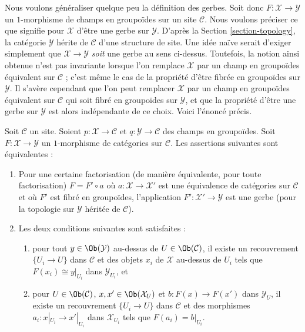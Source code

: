 \noindent
Nous voulons généraliser quelque peu la définition des gerbes. Soit donc
$F : \mathcal{X} \to \mathcal{Y}$ un $1$-morphisme de champs en groupoïdes
sur un site $\mathcal{C}$. Nous voulons préciser ce que signifie
pour $\mathcal{X}$ d'être une gerbe sur $\mathcal{Y}$. D'après la
Section \ref{section-topology},
la catégorie $\mathcal{Y}$ hérite de $\mathcal{C}$ d'une structure de site.
Une idée naïve serait d'exiger simplement que
$\mathcal{X} \to \mathcal{Y}$ {\it soit} une gerbe au sens ci-dessus. Toutefois,
la notion ainsi obtenue n'est pas invariante lorsque l'on remplace $\mathcal{X}$
par un champ en groupoïdes équivalent sur $\mathcal{C}$ ; c'est même le
cas de la propriété d'être fibrée en groupoïdes sur $\mathcal{Y}$.
Il s'avère cependant que l'on peut remplacer $\mathcal{X}$ par un champ
en groupoïdes équivalent sur $\mathcal{C}$ qui soit fibré en groupoïdes sur
$\mathcal{Y}$, et que la propriété d'être une gerbe sur $\mathcal{Y}$
est alors indépendante de ce choix. Voici l'énoncé précis.

\begin{lemma}
\label{lemma-when-gerbe}
Soit $\mathcal{C}$ un site. Soient $p : \mathcal{X} \to \mathcal{C}$
et $q : \mathcal{Y} \to \mathcal{C}$ des champs en groupoïdes.
Soit $F : \mathcal{X} \to \mathcal{Y}$ un $1$-morphisme de catégories
sur $\mathcal{C}$. Les assertions suivantes sont équivalentes :
\begin{enumerate}
\item Pour une certaine factorisation (de manière équivalente, pour toute factorisation)
$F = F' \circ a$ où
$a : \mathcal{X} \to \mathcal{X}'$ est une équivalence de catégories sur
$\mathcal{C}$ et où $F'$ est fibré en groupoïdes, l'application
$F' : \mathcal{X}' \to \mathcal{Y}$ est une gerbe (pour la topologie
sur $\mathcal{Y}$ héritée de $\mathcal{C}$).
\item Les deux conditions suivantes sont satisfaites :
\begin{enumerate}
\item pour tout $y \in \Ob(\mathcal{Y})$ au-dessus de
$U \in \Ob(\mathcal{C})$, il existe un recouvrement
$\{U_i \to U\}$ dans $\mathcal{C}$ et des objets $x_i$ de $\mathcal{X}$
au-dessus de $U_i$ tels que $F(x_i) \cong y|_{U_i}$ dans $\mathcal{Y}_{U_i}$, et
\item pour $U \in \Ob(\mathcal{C})$,
$x, x' \in \Ob(\mathcal{X}_U)$ et $b : F(x) \to F(x')$ dans
$\mathcal{Y}_U$, il existe
un recouvrement $\{U_i \to U\}$ dans $\mathcal{C}$ et des morphismes
$a_i : x|_{U_i} \to x'|_{U_i}$ dans $\mathcal{X}_{U_i}$ tels que
$F(a_i) = b|_{U_i}$.
\end{enumerate}
\end{enumerate}
\end{lemma}

